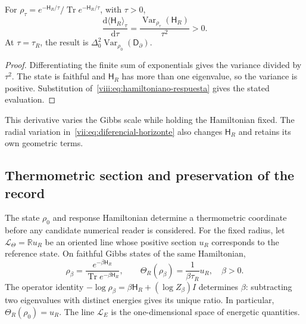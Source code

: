 \begin{corollary}
\label{viii:cor:respuesta-escala-termica}
For \(\rho_\tau=e^{-\mathsf H_R/\tau}/
\operatorname{Tr}e^{-\mathsf H_R/\tau}\), with \(\tau>0\),
\begin{equation}
 \frac{\mathrm d\langle\mathsf H_R\rangle_\tau}{\mathrm d\tau}
 =\frac{\operatorname{Var}_{\rho_\tau}(\mathsf H_R)}{\tau^2}>0.
 \label{viii:eq:susceptibilidad-termica}
\end{equation}
At \(\tau=\tau_R\), the result is
\(\Delta_0^2\operatorname{Var}_{\rho_0}(\mathsf D_\partial)\).
\end{corollary}
\begin{proof}
Differentiating the finite sum of exponentials gives the variance
divided by \(\tau^2\). The state is faithful and \(\mathsf H_R\)
has more than one eigenvalue, so the variance is positive. Substitution
of~\eqref{viii:eq:hamiltoniano-respuesta} gives the stated evaluation.
\end{proof}

This derivative varies the Gibbs scale while holding the Hamiltonian
fixed. The radial variation in~\eqref{vii:eq:diferencial-horizonte}
also changes \(\mathsf H_R\) and retains its own geometric terms.

\subsection{Thermometric section and preservation of the record}
\label{viii:subsec:seccion-termometrica-registro}

The state \(\rho_0\) and response Hamiltonian determine a thermometric
coordinate before any candidate numerical reader is considered.
For the fixed radius, let \(\mathcal L_\Theta=\mathbb R u_R\) be
an oriented line whose positive section \(u_R\) corresponds to the
reference state. On faithful Gibbs states of the same Hamiltonian,
\begin{equation}
 \rho_\beta=\frac{e^{-\beta\mathsf H_R}}
                  {\operatorname{Tr}e^{-\beta\mathsf H_R}},\qquad
 \Theta_R(\rho_\beta)=\frac{1}{\beta\tau_R}u_R,
 \quad \beta>0.
 \label{viii:eq:lector-termometrico}
\end{equation}
The operator identity
\(-\log\rho_\beta=\beta\mathsf H_R+(\log Z_\beta)I\)
determines \(\beta\): subtracting two eigenvalues with distinct
energies gives its unique ratio. In particular,
\(\Theta_R(\rho_0)=u_R\).
The line \(\mathcal L_E\) is the one-dimensional space of energetic
quantities.

